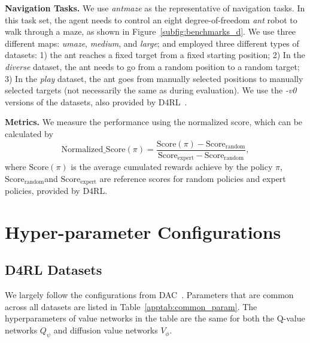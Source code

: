 \textbf{Navigation Tasks. }We use \textit{antmaze} as the representative of navigation tasks. In this task set, the agent needs to control an eight degree-of-freedom \textit{ant} robot to walk through a maze, as shown in Figure~\ref{subfig:benchmarks_d}. We use three different maps: \textit{umaze}, \textit{medium}, and \textit{large}; and employed three different types of datasets: 1) the ant reaches a fixed target from a fixed starting position; 2) In the \textit{diverse} dataset, the ant needs to go from a random position to a random target; 3) In the \textit{play} dataset, the ant goes from manually selected positions to manually selected targets (not necessarily the same as during evaluation). We use the \textit{-v0} versions of the datasets, also provided by D4RL~\citep{d4rl}. 

\textbf{Metrics. }We measure the performance using the normalized score, which can be calculated by
$$
\text{Normalized\_Score}(\pi)=\frac{\text{Score}(\pi) - \text{Score}_{\text{random}}}{\text{Score}_\text{expert}-\text{Score}_{\text{random}}},
$$
where $\text{Score}(\pi)$ is the average cumulated rewards achieve by the policy $\pi$,  $\text{Score}_{\text{random}}$and $\text{Score}_{\text{expert}}$ are reference scores for random policies and expert policies, provided by D4RL. 


\section{Hyper-parameter Configurations}\label{appsec:hyperparameters}

\subsection{D4RL Datasets}
We largely follow the configurations from DAC~\citep{dac}. Parameters that are common across all datasets are listed in Table~\ref{apptab:common_param}. The hyperparameters of value networks in the table are the same for both the Q-value networks $Q_{\psi}$ and diffusion value networks $V_{\phi}. $

